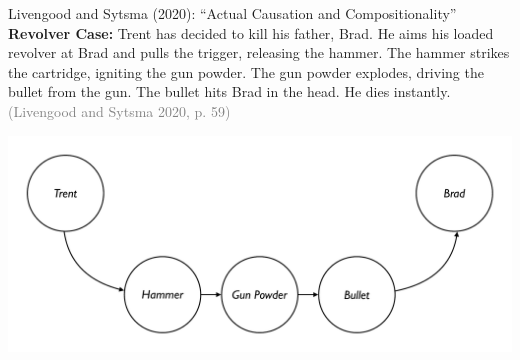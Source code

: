 \documentclass[xcolor=table,9pt,aspectratio=169]{beamer}
\begin{document}
\begin{frame}{\vspace*{10mm}Livengood and Sytsma (2020): ``Actual Causation and Compositionality''}
\vspace*{-5mm}
\textbf{Revolver Case:} Trent has decided to kill his father, Brad. He aims his loaded revolver at Brad and pulls the trigger, releasing the hammer. The hammer strikes the cartridge, igniting the gun powder. The gun powder explodes, driving the bullet from the gun. The bullet hits Brad in the head. He dies instantly. \textcolor{gray}{(Livengood and Sytsma 2020, p. 59)}
\begin{center}
   \includegraphics[width=0.75\linewidth]{figures/revolver.pdf}
\end{center}
\end{frame}
\end{document}
